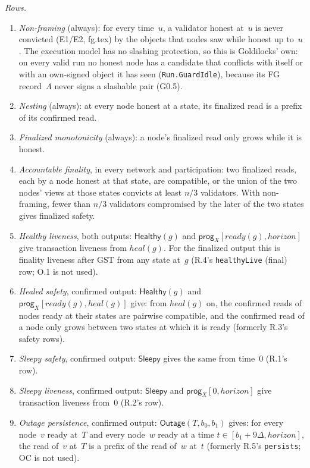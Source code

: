 \documentclass{article}
\begin{document}
\emph{Rows.}
\begin{enumerate}[itemsep=1pt]
\item \emph{Non-framing} (always): for every time~$u$, a validator honest
  at~$u$ is never convicted (E1/E2, fg.tex) by the objects that nodes saw
  while honest up to~$u$.  The execution model has no slashing protection,
  so this is Goldilocks' own: on every valid run no honest node has a
  candidate that conflicts with itself or with an own-signed object it has
  seen (\texttt{Run.GuardIdle}), because its FG record~$\Lambda$ never
  signs a slashable pair (G0.5).
\item \emph{Nesting} (always): at every node honest at a state, its
  finalized read is a prefix of its confirmed read.
\item \emph{Finalized monotonicity} (always): a node's finalized read only
  grows while it is honest.
\item \emph{Accountable finality}, in every network and participation: two
  finalized reads, each by a node honest at that state, are compatible, or
  the union of the two nodes' views at those states convicts at least $n/3$
  validators.  With non-framing, fewer than $n/3$ validators compromised by the later
  of the two states gives finalized safety.
\item \emph{Healthy liveness}, both outputs: $\mathsf{Healthy}(g)$ and
  $\mathsf{prog}_X[\mathit{ready}(g),\mathit{horizon}]$ give transaction
  liveness from $\mathit{heal}(g)$.  For the finalized output this is
  finality liveness after GST from any state at~$g$ (R.4's \texttt{healthyLive} (final) row; O.1 is not used).
\item \emph{Healed safety}, confirmed output: $\mathsf{Healthy}(g)$ and
  $\mathsf{prog}_X[\mathit{ready}(g),\mathit{heal}(g)]$ give: from
  $\mathit{heal}(g)$ on, the confirmed reads of nodes ready at their states
  are pairwise compatible, and the confirmed read of a node only grows
  between two states at which it is ready (formerly R.3's safety rows).
\item \emph{Sleepy safety}, confirmed output: $\mathsf{Sleepy}$ gives the
  same from time~$0$ (R.1's row).
\item \emph{Sleepy liveness}, confirmed output: $\mathsf{Sleepy}$ and
  $\mathsf{prog}_X[0,\mathit{horizon}]$ give transaction liveness from~$0$
  (R.2's row).
\item \emph{Outage persistence}, confirmed output:
  $\mathsf{Outage}(T,b_0,b_1)$ gives: for every node~$v$ ready at~$T$ and
  every node~$w$ ready at a time $t\in[b_1+9\Delta,\mathit{horizon}]$, the
  read of~$v$ at~$T$ is a prefix of the read of~$w$ at~$t$ (formerly R.5's
  \texttt{persists}; OC is not used).
\end{enumerate}
\end{document}
